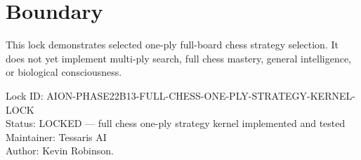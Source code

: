 \documentclass[11pt,a4paper]{article}
\begin{document}
\section{Boundary}

This lock demonstrates selected one-ply full-board chess strategy selection. It does not yet implement multi-ply search, full chess mastery, general intelligence, or biological consciousness.

\bigskip

\noindent
Lock ID: AION-PHASE22B13-FULL-CHESS-ONE-PLY-STRATEGY-KERNEL-LOCK\\
Status: LOCKED --- full chess one-ply strategy kernel implemented and tested\\
Maintainer: Tessaris AI\\
Author: Kevin Robinson.
\end{document}
